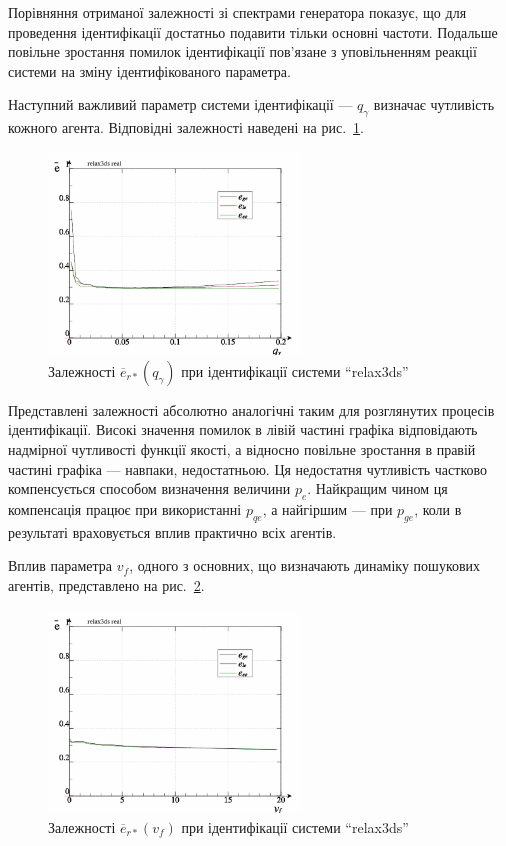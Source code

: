 Порівняння отриманої залежності зі спектрами генератора
показує, що для проведення ідентифікації достатньо подавити
тільки основні частоти. Подальше повільне зростання помилок
ідентифікації пов'язане з уповільненням реакції системи на
зміну ідентифікованого параметра.

Наступний важливий параметр системи ідентифікації ---
$q_\gamma $ визначає чутливість кожного агента. Відповідні
залежності наведені на рис.~\ref{atu:f:relax3ds_read_id2_prm_0-p_q_gamma}.


\begin{figure}[htb!]
  \centerline{\includegraphics[width=0.6\textwidth]{p/relax3ds_read_id2_prm_0-p_q_gamma.png} }
  \caption{Залежності $ \overline{e}_{r *} (q_\gamma) $ при ідентифікації системи ``relax3ds''}
  \label{atu:f:relax3ds_read_id2_prm_0-p_q_gamma}
\end{figure}

Представлені залежності абсолютно аналогічні таким для
розглянутих процесів ідентифікації. Високі значення помилок
в лівій частині графіка відповідають надмірної чутливості
функції якості, а відносно повільне зростання в правій
частині графіка --- навпаки, недостатньою. Ця недостатня
чутливість частково компенсується способом визначення величини
$p_e $. Найкращим чином ця компенсація працює при використанні
$p_{qe}$, а найгіршим --- при
$p_{ge}$, коли в результаті враховується вплив практично всіх
агентів.

Вплив параметра
$v_f $, одного з основних, що визначають динаміку пошукових
агентів, представлено на рис.~\ref{atu:f:relax3ds_read_id2_prm_0-p_v_f}.

\begin{figure}[htb!]
  \centerline{\includegraphics[width=0.6\textwidth]{p/relax3ds_read_id2_prm_0-p_v_f.png} }
  \caption{Залежності $ \overline{e}_{r *} (v_f) $ при ідентифікації системи ``relax3ds''}
  \label{atu:f:relax3ds_read_id2_prm_0-p_v_f}
\end{figure}

